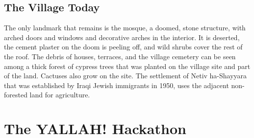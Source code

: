 \subsection{The Village Today}

The only landmark that remains is the mosque, a doomed, stone structure, with arched doors and windows and decorative arches in the interior. It is deserted, the cement plaster on the doom is peeling off, and wild shrubs cover the rest of the roof. The debris of houses, terraces, and the village cemetery can be seen among a thick forest of cypress trees that was planted on the village site and part of the land. Cactuses also grow on the site. The settlement of Netiv ha-Shayyara that was established by Iraqi Jewish immigrants in 1950, uses the adjacent non-forested land for agriculture.    

\section{The YALLAH! Hackathon}

